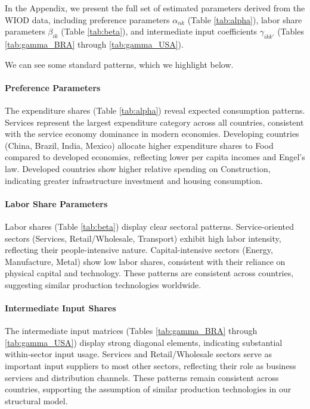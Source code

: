 In the Appendix, we present the full set of estimated parameters derived from the WIOD data, including preference parameters $\alpha_{nk}$ (Table \ref{tab:alpha}), labor share parameters $\beta_{ik}$ (Table \ref{tab:beta}), and intermediate input coefficients $\gamma_{ikk'}$ (Tables \ref{tab:gamma_BRA} through \ref{tab:gamma_USA}). 

We can see some standard patterns, which we highlight below.

\paragraph{Preference Parameters} The expenditure shares (Table \ref{tab:alpha}) reveal expected consumption patterns. Services represent the largest expenditure category across all countries, consistent with the service economy dominance in modern economies. Developing countries (China, Brazil, India, Mexico) allocate higher expenditure shares to Food compared to developed economies, reflecting lower per capita incomes and Engel's law. Developed countries show higher relative spending on Construction, indicating greater infrastructure investment and housing consumption.

\paragraph{Labor Share Parameters} Labor shares (Table \ref{tab:beta}) display clear sectoral patterns. Service-oriented sectors (Services, Retail/Wholesale, Transport) exhibit high labor intensity, reflecting their people-intensive nature. Capital-intensive sectors (Energy, Manufacture, Metal) show low labor shares, consistent with their reliance on physical capital and technology. These patterns are consistent across countries, suggesting similar production technologies worldwide.

\paragraph{Intermediate Input Shares} The intermediate input matrices (Tables \ref{tab:gamma_BRA} through \ref{tab:gamma_USA}) display strong diagonal elements, indicating substantial within-sector input usage. Services and Retail/Wholesale sectors serve as important input suppliers to most other sectors, reflecting their role as business services and distribution channels. These patterns remain consistent across countries, supporting the assumption of similar production technologies in our structural model.

